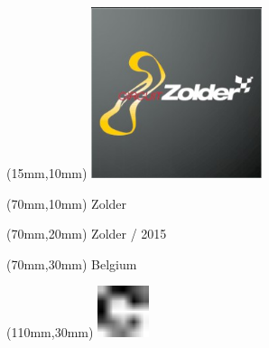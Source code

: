 \null\newpage
\begin{textblock*}{50mm}(15mm,10mm)%
\includegraphics[width=50mm]{LG/2015-05-20_00100.png}
\end{textblock*}
\begin{textblock*}{130mm}(70mm,10mm)%
{\fontsize{20}{20}\selectfont Zolder}\\
\end{textblock*}
\begin{textblock*}{120mm}(70mm,20mm)%
{\fontsize{16}{16}\selectfont Zolder / 2015}\\
\end{textblock*}
\begin{textblock*}{120mm}(70mm,30mm)%
{\fontsize{12}{12}\selectfont Belgium}
\end{textblock*}
\begin{textblock*}{30mm}(110mm,30mm)%
\centering
\includegraphics[height=15mm]{icons/fa-rotate-right.pdf}
\end{textblock*}
